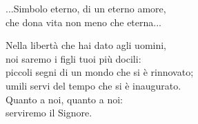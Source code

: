 \spazio

...Simbolo eterno, di un eterno amore,\\
che dona vita non meno che eterna...

\spazio

Nella libertà che hai dato agli uomini,\\
noi saremo i figli tuoi più docili:\\
piccoli segni di un mondo che si è rinnovato;\\
umili servi del tempo che si è inaugurato.\\
Quanto a noi, quanto a noi:\\
serviremo il Signore.
